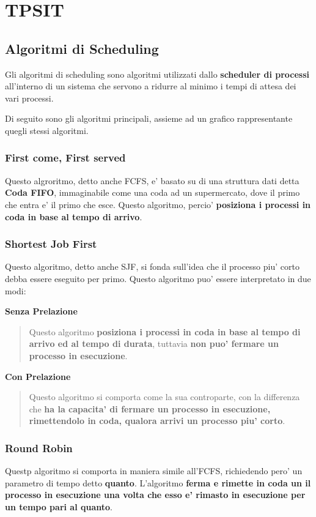 \documentclass{article}
\begin{document}
  \section{TPSIT}
  {
    \subsection{Algoritmi di Scheduling}
    Gli algoritmi di scheduling sono algoritmi utilizzati dallo \textbf{scheduler di processi} all'interno di un sistema che servono a ridurre al minimo i tempi di attesa dei vari processi.

    Di seguito sono gli algoritmi principali, assieme ad un grafico rappresentante quegli stessi algoritmi.

    \subsubsection{First come, First served}
    Questo algroritmo, detto anche FCFS, e' basato su di una struttura dati detta \textbf{Coda FIFO}, immaginabile come una coda ad un supermercato, dove il primo che entra e' il primo che esce. Questo algoritmo, percio' \textbf{posiziona i processi in coda in base al tempo di arrivo}.

    \subsubsection{Shortest Job First}
    Questo algoritmo, detto anche SJF, si fonda sull'idea che il processo piu' corto debba essere eseguito per primo. Questo algoritmo puo' essere interpretato in due modi:

    \textbf{Senza Prelazione}
    \begin{quote}
      Questo algoritmo \textbf{posiziona i processi in coda in base al tempo di arrivo ed al tempo di durata}, tuttavia \textbf{non puo' fermare un processo in esecuzione}.
    \end{quote}

    \textbf{Con Prelazione}
    \begin{quote}
      Questo algoritmo si comporta come la sua controparte, con la differenza che \textbf{ha la capacita' di fermare un processo in esecuzione, rimettendolo in coda, qualora arrivi un processo piu' corto}.
    \end{quote}

    \subsubsection{Round Robin}
    Questp algoritmo si comporta in maniera simile all'FCFS, richiedendo pero' un parametro di tempo detto \textbf{quanto}. L'algoritmo \textbf{ferma e rimette in coda un il processo in esecuzione una volta che esso e' rimasto in esecuzione per un tempo pari al quanto}. 

}
\end{document}
